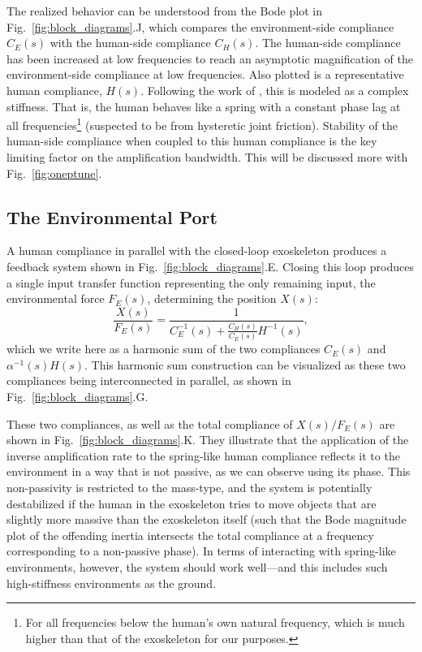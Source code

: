 The realized behavior can be understood from the Bode plot in Fig.~\ref{fig:block_diagrams}.J, which compares the environment-side compliance $C_E(s)$ with the human-side compliance $C_H(s)$. The human-side compliance has been increased at low frequencies to reach an asymptotic magnification of the environment-side compliance at low frequencies. Also plotted is a representative human compliance, $H(s)$. Following the work of \cite{HeHuangThomasSentis2019IROS,HeHuangThomasSentis2020TNSRE}, this is modeled as a complex stiffness. That is, the human behaves like a spring with a constant phase lag at all frequencies\footnote{For all frequencies below the human's own natural frequency, which is much higher than that of the exoskeleton for our purposes.} (suspected to be from hysteretic joint friction). Stability of the human-side compliance when coupled to this human compliance is the key limiting factor on the amplification bandwidth. This will be discussed more with Fig.~\ref{fig:oneptune}.

\subsection{The Environmental Port}
A human compliance in parallel with the closed-loop exoskeleton produces a feedback system shown in Fig.~\ref{fig:block_diagrams}.E. Closing this loop produces a single input transfer function representing the only remaining input, the environmental force $F_E(s)$, determining the position $X(s)$:
\begin{equation}
\frac{X(s)}{F_E(s)} = \frac{1}{C_E^{-1}(s) + \frac{C_H(s)}{C_E(s)}H^{-1}(s)},
\end{equation}
which we write here as a harmonic sum of the two compliances $C_E(s)$ and $\alpha^{-1}(s)H(s)$. This harmonic sum construction can be visualized as these two compliances being interconnected in parallel, as shown in Fig.~\ref{fig:block_diagrams}.G.

These two compliances, as well as the total compliance of $X(s)/F_E(s)$\ta{,} are shown in Fig.~\ref{fig:block_diagrams}.K. They illustrate that the application of the inverse amplification rate to the spring-like human compliance reflects it to the environment in a way that is not passive, as we can observe using its phase. This non-passivity is restricted to the mass-type, and the system is potentially destabilized if the human in the exoskeleton tries to move objects that are slightly more massive than the exoskeleton itself (such that the Bode magnitude plot of the offending inertia intersects the total compliance at a frequency corresponding to a non-passive phase). In terms of interacting with spring-like environments, however, the system should work well---and this includes such high-stiffness environments as the ground.

